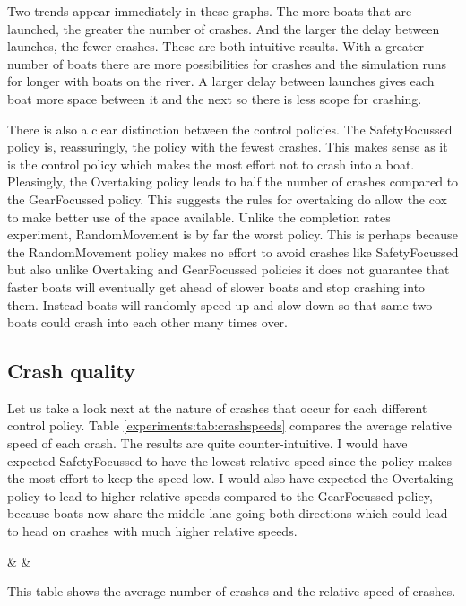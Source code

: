   Two trends appear immediately in these graphs. The more boats that are launched, the greater the number of crashes. And the larger the delay between launches, the fewer crashes. These are both intuitive results. With a greater number of boats there are more possibilities for crashes and the simulation runs for longer with boats on the river. A larger delay between launches gives each boat more space between it and the next so there is less scope for crashing.
  
  There is also a clear distinction between the control policies. The SafetyFocussed policy is, reassuringly, the policy with the fewest crashes. This makes sense as it is the control policy which makes the most effort not to crash into a boat. Pleasingly, the Overtaking policy leads to half the number of crashes compared to the GearFocussed policy. This suggests the rules for overtaking do allow the cox to make better use of the space available. Unlike the completion rates experiment, RandomMovement is by far the worst policy. This is perhaps because the RandomMovement policy makes no effort to avoid crashes like SafetyFocussed but also unlike Overtaking and GearFocussed policies it does not guarantee that faster boats will eventually get ahead of slower boats and stop crashing into them. Instead boats will randomly speed up and slow down so that same two boats could crash into each other many times over.

  \subsection{Crash quality}
  Let us take a look next at the nature of crashes that occur for each different control policy. Table \ref{experiments:tab:crashspeeds} compares the average relative speed of each crash. The results are quite counter-intuitive. I would have expected SafetyFocussed to have the lowest relative speed since the policy makes the most effort to keep the speed low. I would also have expected the Overtaking policy to lead to higher relative speeds compared to the GearFocussed policy, because boats now share the middle lane going both directions which could lead to head on crashes with much higher relative speeds.
  
  \begin{table}[h]
  \centering
  {\cp & \crashes & \speed}
  \caption{This table shows the average number of crashes and the relative speed of crashes.}
  \label{experiments:tab:crashspeeds}
  \end{table}
  
